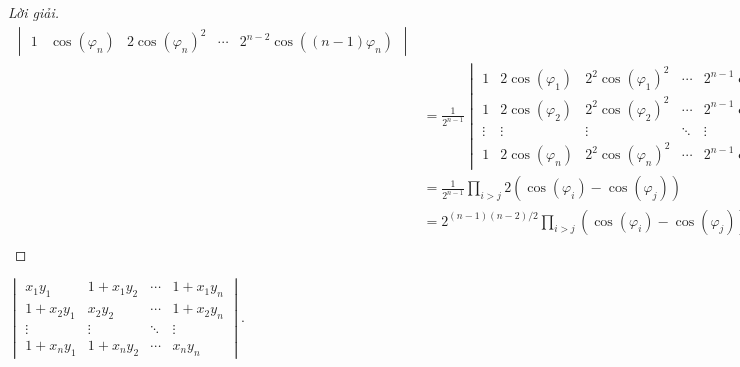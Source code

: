 \documentclass[class=linear-algebra,crop=false]{standalone}
\begin{document}
\begin{proof}[Lời giải]
\begin{align*}
\begin{vmatrix}
			1      & \cos(\varphi_{n}) & 2{\cos(\varphi_{n})}^{2} & \cdots & 2^{n-2}\cos((n-1)\varphi_{n})
		\end{vmatrix}              \\
		 & = \frac{1}{2^{n-1}}
		\begin{vmatrix}
			1      & 2\cos(\varphi_{1}) & 2^{2}{\cos(\varphi_{1})}^{2} & \cdots & 2^{n-1}{\cos(\varphi_{1})}^{n-1} \\
			1      & 2\cos(\varphi_{2}) & 2^{2}{\cos(\varphi_{2})}^{2} & \cdots & 2^{n-1}{\cos(\varphi_{2})}^{n-2} \\
			\vdots & \vdots             & \vdots                       & \ddots & \vdots                           \\
			1      & 2\cos(\varphi_{n}) & 2^{2}{\cos(\varphi_{n})}^{2} & \cdots & 2^{n-1}{\cos(\varphi_{n})}^{n-1}
		\end{vmatrix} \\
		 & = \frac{1}{2^{n-1}}\prod_{i>j}2(\cos(\varphi_{i}) - \cos(\varphi_{j}))                                        \\
		 & = 2^{(n-1)(n-2)/2}\prod_{i>j}(\cos(\varphi_{i}) - \cos(\varphi_{j})).                                         \\
	\end{align*}
	\endgroup{}
\end{proof}

\begin{exercise}
	$\begin{vmatrix}
			x_{1}y_{1}     & 1 + x_{1}y_{2} & \cdots & 1 + x_{1}y_{n} \\
			1 + x_{2}y_{1} & x_{2}y_{2}     & \cdots & 1 + x_{2}y_{n} \\
			\vdots         & \vdots         & \ddots & \vdots         \\
			1 + x_{n}y_{1} & 1 + x_{n}y_{2} & \cdots & x_{n}y_{n}
		\end{vmatrix}$.
\end{exercise}
\end{document}
